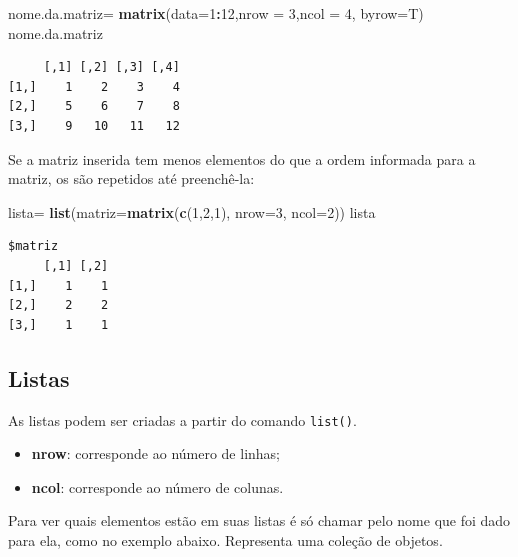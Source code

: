 \documentclass[12pt,brazil,oneside]{book}
\newenvironment{Shaded}{\begin{snugshade}}{\end{snugshade}}
\newcommand{\DataTypeTok}[1]{\textcolor[rgb]{0.13,0.29,0.53}{#1}}
\newcommand{\DecValTok}[1]{\textcolor[rgb]{0.00,0.00,0.81}{#1}}
\newcommand{\KeywordTok}[1]{\textcolor[rgb]{0.13,0.29,0.53}{\textbf{#1}}}
\newcommand{\NormalTok}[1]{#1}
\newcommand{\OperatorTok}[1]{\textcolor[rgb]{0.81,0.36,0.00}{\textbf{#1}}}
\newcommand{\StringTok}[1]{\textcolor[rgb]{0.31,0.60,0.02}{#1}}
\providecommand{\tightlist}{%
  \setlength{\itemsep}{0pt}\setlength{\parskip}{0pt}}
\begin{document}
\begin{Shaded}
\begin{Highlighting}[]
\NormalTok{nome.da.matriz=}\StringTok{ }\KeywordTok{matrix}\NormalTok{(}\DataTypeTok{data=}\DecValTok{1}\OperatorTok{:}\DecValTok{12}\NormalTok{,}\DataTypeTok{nrow =} \DecValTok{3}\NormalTok{,}\DataTypeTok{ncol =} \DecValTok{4}\NormalTok{, }\DataTypeTok{byrow=}\NormalTok{T)}
\NormalTok{nome.da.matriz}
\end{Highlighting}
\end{Shaded}

\begin{verbatim}
     [,1] [,2] [,3] [,4]
[1,]    1    2    3    4
[2,]    5    6    7    8
[3,]    9   10   11   12
\end{verbatim}

Se a matriz inserida tem menos elementos do que a ordem informada para a matriz, os são repetidos até preenchê-la:

\begin{Shaded}
\begin{Highlighting}[]
\NormalTok{lista=}\StringTok{ }\KeywordTok{list}\NormalTok{(}\DataTypeTok{matriz=}\KeywordTok{matrix}\NormalTok{(}\KeywordTok{c}\NormalTok{(}\DecValTok{1}\NormalTok{,}\DecValTok{2}\NormalTok{,}\DecValTok{1}\NormalTok{), }\DataTypeTok{nrow=}\DecValTok{3}\NormalTok{, }\DataTypeTok{ncol=}\DecValTok{2}\NormalTok{))}
\NormalTok{lista}
\end{Highlighting}
\end{Shaded}

\begin{verbatim}
$matriz
     [,1] [,2]
[1,]    1    1
[2,]    2    2
[3,]    1    1
\end{verbatim}

\hypertarget{listas}{%
\subsection{Listas}\label{listas}}

As listas podem ser criadas a partir do comando \texttt{list()}.

\begin{itemize}
\tightlist
\item
  \textbf{nrow}: corresponde ao número de linhas;
\item
  \textbf{ncol}: corresponde ao número de colunas.
\end{itemize}

Para ver quais elementos estão em suas listas é só chamar pelo nome que foi dado para ela, como no exemplo abaixo. Representa uma coleção de objetos.
\end{document}
